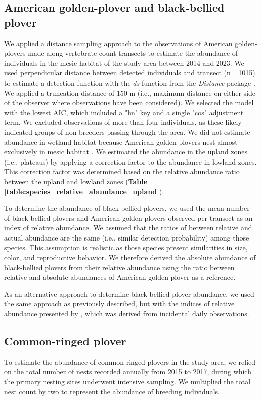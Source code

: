 \documentclass[a4paper,twoside,10pt]{article}
\begin{document}
\subsection{American golden-plover and black-bellied plover}
We applied a distance sampling approach to the observations of American golden-plovers made along vertebrate count transects to estimate the abundance of individuals in the mesic habitat of the study area between 2014 and 2023. We used perpendicular distance between detected individuals and transect (n= 1015) to estimate a detection function with the \textit{ds} function from the \textit{Distance} package \citep{miller2019}. We applied a truncation distance of 150 m (i.e., maximum distance on either side of the observer where observations have been considered). We selected the model with the lowest AIC, which included a "hn" key and a single "cos" adjustment term. We excluded observations of more than four individuals, as these likely indicated groups of non-breeders passing through the area. We did not estimate abundance in wetland habitat because American golden-plovers nest almost exclusively in mesic habitat \citep{parmelee1967}. We estimated the abundance in the upland zones (i.e., plateaus) by applying a correction factor to the abundance in lowland zones. This correction factor was determined based on the relative abundance ratio between the upland and lowland zones (\textbf{Table \ref{table:species_relative_abundance_upland}}).

To determine the abundance of black-bellied plovers, we used the mean number of black-bellied plovers and American golden-plovers observed per transect as an index of relative abundance. We assumed that the ratios of between relative and actual abundance are the same (i.e., similar detection probability) among those species. This assumption is realistic as those species present similarities in size, color, and reproductive behavior. We therefore derived the absolute abundance of black-bellied plovers from their relative abundance using the ratio between relative and absolute abundances of American golden-plover as a reference.

As an alternative approach to determine black-bellied plover abundance, we used the same approach as previously described, but with the indices of relative abundance presented by \citet{gauthier2024a}, which was derived from incidental daily observations.

\subsection{Common-ringed plover}
To estimate the abundance of common-ringed plovers in the study area, we relied on the total number of nests recorded annually from 2015 to 2017, during which the primary nesting sites underwent intensive sampling. We multiplied the total nest count by two to represent the abundance of breeding individuals.
\end{document}
